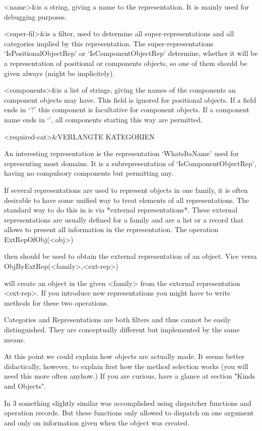 \beginitems
<name>&is a string, giving a name to the representation. It is mainly used for
debugging purposes.

<super-fil>&is a filter, used to determine all super-representations and all 
categories implied by this representation. The super-representations
`IsPositionalObjectRep' or `IsComponentObjectRep' determine, whether it will
be a representation of positional or components objects, so one of them
should be given always (might be implicitely).

<components>&is a list of strings, giving the names of the components an
component objects may have. This field is ignored for positional objects.
If a field ends in `?' this component is facultative for component objects.
If a component name ends in `\*', all components starting this way are
permitted.

<required-cat>&VERLANGTE KATEGORIEN
\enditems

\danger
An interesting representation is the representation `WhatsItsName' used for
representing most domains. It is a subrepresentation of
`IsComponentObjectRep', having no compulsory components but permitting any.

\danger
If several representations are used to represent objects in one family, it
is often desirable to have some unified way to treat elements of all
representations. The standard way to do this in {\GAP} is via *external
representations*. These external representations are usually defined for a
family and are a list or a record that allows to present all information in
the representation. The operation 
\>ExtRepOfObj(<obj>)

then should be used to obtain the external representation of
an object. Vice versa 
\>ObjByExtRep(<family>,<ext-rep>)

will create an object in the given <family> from the external representation
<ext-rep>. If you introduce new representations you might have to write
methods for these two operations.

\danger
Categories and Representations are both filters and thus cannot be easily
distinguished. They are conceptually different but implemented by the same
means.

At this point we could explain how objects are actually made. It seems
better didactically, however, to explain first how the method selection
works (you will need this more often anyhow.) If you are curious, have a
glance at section "Kinds and Objects".


\danger
In {\GAP} 3 something slightly similar was accomplished using dispatcher
functions and operation records. But these functions only allowed to
dispatch on one argument and only on information given when the object was
created.

